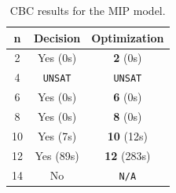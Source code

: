 \begin{table}[H]
\centering
\begin{tabular}{c|c|c}
\hline
n & Decision & Optimization \\
\hline
2  & Yes (0s)   &  \textbf{2} (0s) \\
4  & \texttt{UNSAT} & \texttt{UNSAT} \\
6  & Yes (0s)  & \textbf{6} (0s)  \\
8  & Yes (0s)  & \textbf{8} (0s)   \\
10 & Yes (7s)  & \textbf{10} (12s) \\
12 & Yes (89s) & \textbf{12} (283s)  \\
14 & No       & \texttt{N/A}  \\
\hline
\end{tabular}
\caption{CBC results for the MIP model.}
\label{tab:mip_results}
\end{table}
